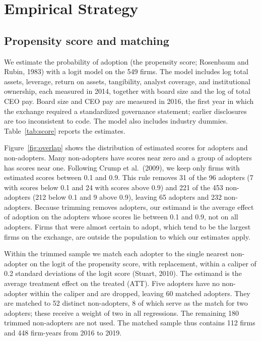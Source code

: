 \documentclass[11pt]{article}
\begin{document}
\section{Empirical Strategy}

\subsection{Propensity score and matching}

We estimate the probability of adoption (the propensity score; Rosenbaum and Rubin, 1983) with a logit model on the 549 firms. The model includes log total assets, leverage, return on assets, tangibility, analyst coverage, and institutional ownership, each measured in 2014, together with board size and the log of total CEO pay. Board size and CEO pay are measured in 2016, the first year in which the exchange required a standardized governance statement; earlier disclosures are too inconsistent to code. The model also includes industry dummies. Table~\ref{tab:score} reports the estimates.

Figure~\ref{fig:overlap} shows the distribution of estimated scores for adopters and non-adopters. Many non-adopters have scores near zero and a group of adopters has scores near one. Following Crump et al.\ (2009), we keep only firms with estimated scores between 0.1 and 0.9. This rule removes 31 of the 96 adopters (7 with scores below 0.1 and 24 with scores above 0.9) and 221 of the 453 non-adopters (212 below 0.1 and 9 above 0.9), leaving 65 adopters and 232 non-adopters. Because trimming removes adopters, our estimand is the average effect of adoption on the adopters whose scores lie between 0.1 and 0.9, not on all adopters. Firms that were almost certain to adopt, which tend to be the largest firms on the exchange, are outside the population to which our estimates apply.

Within the trimmed sample we match each adopter to the single nearest non-adopter on the logit of the propensity score, with replacement, within a caliper of 0.2 standard deviations of the logit score (Stuart, 2010). The estimand is the average treatment effect on the treated (ATT). Five adopters have no non-adopter within the caliper and are dropped, leaving 60 matched adopters. They are matched to 52 distinct non-adopters, 8 of which serve as the match for two adopters; these receive a weight of two in all regressions. The remaining 180 trimmed non-adopters are not used. The matched sample thus contains 112 firms and 448 firm-years from 2016 to 2019.
\end{document}
